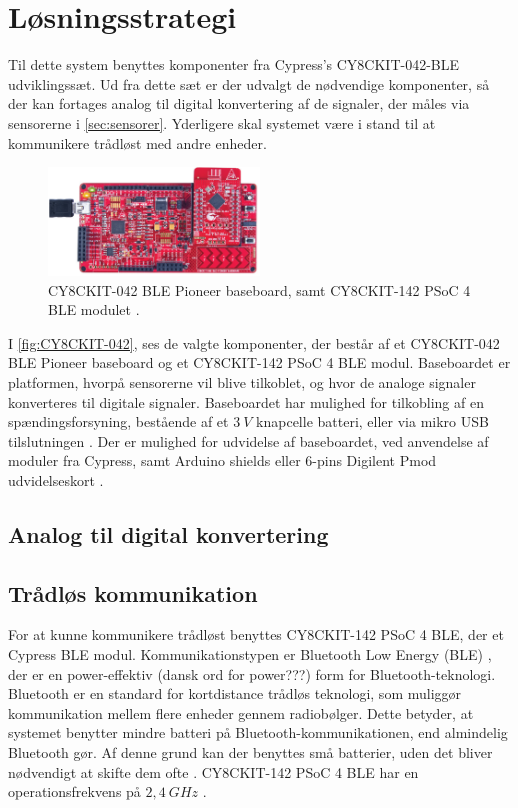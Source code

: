 \section{Løsningsstrategi}
Til dette system benyttes komponenter fra Cypress's CY8CKIT-042-BLE udviklingssæt. 
Ud fra dette sæt er der udvalgt de nødvendige komponenter, så der kan fortages analog til digital konvertering af de signaler, der måles via sensorerne i \autoref{sec:sensorer}. Yderligere skal systemet være i stand til at kommunikere trådløst med andre enheder.   

\begin{figure}[H]
\centering
\includegraphics[width=0.5\textwidth]{figures/CY8CKIT-042.png}
\caption{CY8CKIT-042 BLE Pioneer baseboard, samt CY8CKIT-142 PSoC 4 BLE modulet \citep{cypresspsoc2015}.}
\label{fig:CY8CKIT-042}
\end{figure}

I \autoref{fig:CY8CKIT-042}, ses de valgte komponenter, der består af et CY8CKIT-042 BLE Pioneer baseboard og et CY8CKIT-142 PSoC 4 BLE modul. Baseboardet er platformen, hvorpå sensorerne vil blive tilkoblet, og hvor de analoge signaler konverteres til digitale signaler. Baseboardet har mulighed for tilkobling af en spændingsforsyning, bestående af et $3~V$ knapcelle batteri, eller via mikro USB tilslutningen \citep{cypressguide2014}. Der er mulighed for udvidelse af baseboardet, ved anvendelse af moduler fra Cypress, samt Arduino shields eller 6-pins Digilent Pmod udvidelseskort \citep{cypressguide2014}. 
\\


\subsection{Analog til digital konvertering}


\subsection{Trådløs kommunikation}
For at kunne kommunikere trådløst benyttes CY8CKIT-142 PSoC 4 BLE, der et Cypress BLE modul. Kommunikationstypen er Bluetooth Low Energy (BLE) \citep{cypressguide2014}, der er en power-effektiv (dansk ord for power???) form for Bluetooth-teknologi. Bluetooth er en standard for kortdistance trådløs teknologi, som muliggør kommunikation mellem flere enheder gennem radiobølger. Dette betyder, at systemet benytter mindre batteri på Bluetooth-kommunikationen, end almindelig Bluetooth gør. Af denne grund kan der benyttes små batterier, uden det bliver nødvendigt at skifte dem ofte \citep{gupta2013}. 
CY8CKIT-142 PSoC 4 BLE har en operationsfrekvens på $2,4~GHz$ \citep{cypressguide2014}. 
\\

